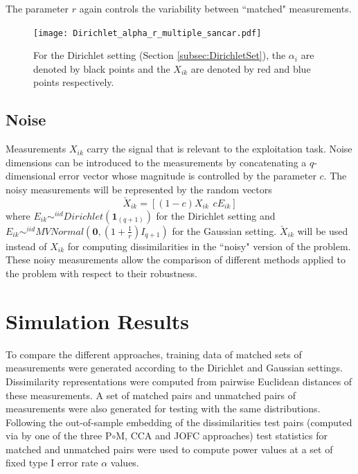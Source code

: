 \documentclass[12pt,oneside,final]{thesis}\usepackage[]{graphicx}\usepackage[]{color}
\begin{document}
 The parameter $r$ again controls the variability between ``matched" measurements.
    \begin{figure}
	\begin{center}
    \texttt{[image: Dirichlet\_alpha\_r\_multiple\_sancar.pdf]}
   \caption{ For the  Dirichlet setting (Section \ref{subsec:DirichletSet}),  the $\alpha_i$ are denoted by black points and the $X_{ik}$ are denoted by red and blue points respectively.}
\label{fig:Fig2}
	\end{center}
  \end{figure}

\subsection{Noise\label{noise}}
Measurements $X_{ik}$ carry the signal that is relevant to the exploitation task. Noise dimensions can be introduced to  the measurements by concatenating a $q$-dimensional error vector whose magnitude is controlled by the parameter $c$. The noisy measurements will be  represented by the random vectors 
 \begin{equation}
\breve{X}_{ik}=[(1-c)X_{ik}\hspace{5pt} cE_{ik}]\label{eq:noise-expr}
\end{equation}
 where $E_{ik} \sim^{iid} Dirichlet(\bm{1}_{(q+1)})\label{eq:noise-model-dir} $ for the Dirichlet setting and $E_{ik} \sim^{iid} MVNormal(\bm{0} , (1+\frac{1}{r})I_{q+1}) \label{eq:noise-model-mvn} $ for the Gaussian setting. $\breve{X}_{ik}$ will be used instead of ${X}_{ik}$ for computing dissimilarities in the ``noisy" version of the problem. These noisy measurements allow the comparison of  different methods applied to the problem with respect to their robustness.
  







\section{Simulation Results\label{sec:Simulation Results}}
To compare the  different approaches, training data of matched sets of measurements were generated according to the Dirichlet and Gaussian settings. Dissimilarity representations were computed from pairwise Euclidean distances of these measurements. A set of matched pairs and unmatched pairs of measurements were also generated for testing with the same distributions. Following the out-of-sample embedding of the dissimilarities test pairs (computed via by one of the three P$\circ $M, CCA and JOFC approaches)  test statistics  for matched and unmatched pairs were used to compute power values at a set of fixed type I error rate $\alpha$ values.
\end{document}

